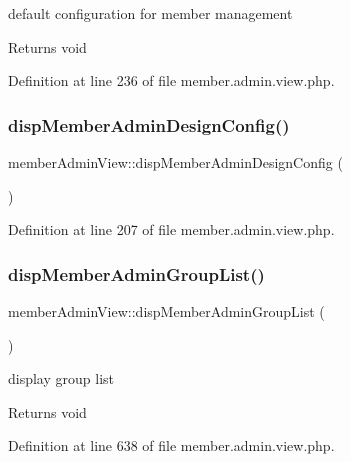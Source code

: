 default configuration for member management

\begin{DoxyReturn}{Returns}
void 
\end{DoxyReturn}


Definition at line 236 of file member.\+admin.\+view.\+php.

\hypertarget{classmemberAdminView_ab9f3ed7d905d09ea8ad49acdc22fe326}{}\label{classmemberAdminView_ab9f3ed7d905d09ea8ad49acdc22fe326} 
\subsubsection{\texorpdfstring{disp\+Member\+Admin\+Design\+Config()}{dispMemberAdminDesignConfig()}}
{\footnotesize\ttfamily member\+Admin\+View\+::disp\+Member\+Admin\+Design\+Config (\begin{DoxyParamCaption}{ }\end{DoxyParamCaption})}



Definition at line 207 of file member.\+admin.\+view.\+php.

\hypertarget{classmemberAdminView_a4a1e4b416515bdcdb1459f44398eb412}{}\label{classmemberAdminView_a4a1e4b416515bdcdb1459f44398eb412} 
\subsubsection{\texorpdfstring{disp\+Member\+Admin\+Group\+List()}{dispMemberAdminGroupList()}}
{\footnotesize\ttfamily member\+Admin\+View\+::disp\+Member\+Admin\+Group\+List (\begin{DoxyParamCaption}{ }\end{DoxyParamCaption})}

display group list

\begin{DoxyReturn}{Returns}
void 
\end{DoxyReturn}


Definition at line 638 of file member.\+admin.\+view.\+php.


